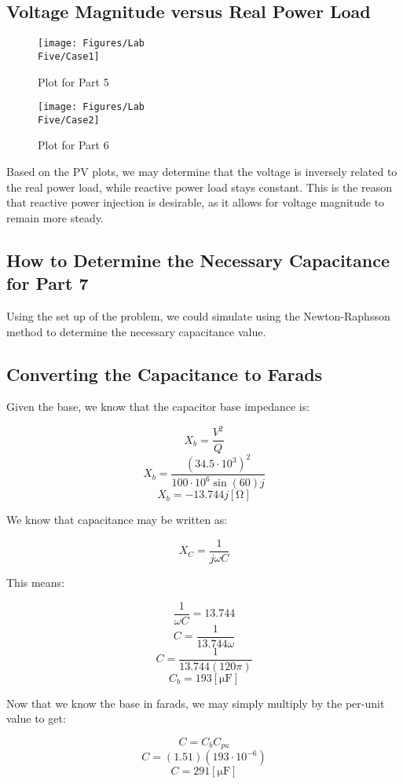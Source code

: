 \documentclass[
	letterpaper, %
	10pt, %
]{CSUniSchoolLabReport}
\begin{document}
\subsection{Voltage Magnitude versus Real Power Load}

\begin{figure}[H]
  \centering
  \texttt{[image: Figures/Lab\\ Five/Case1]}
  \caption{Plot for Part 5}
  \label{fig:10}
\end{figure}

\begin{figure}[H]
  \centering
  \texttt{[image: Figures/Lab\\ Five/Case2]}
  \caption{Plot for Part 6}
  \label{fig:11}
\end{figure}

Based on the PV plots, we may determine that the voltage is inversely related to the real power load, while reactive power load stays constant. This is the reason that reactive power injection is desirable, as it allows for voltage magnitude to remain more steady.

\subsection{How to Determine the Necessary Capacitance for Part 7}

Using the set up of the problem, we could simulate using the Newton-Raphsson method to determine the necessary capacitance value.

\subsection{Converting the Capacitance to Farads}

Given the base, we know that the capacitor base impedance is:

$$X_{b}=\frac{V^2}{Q}$$
$$X_{b}=\frac{(34.5\cdot10^3)^2}{100\cdot10^{6}\sin(60)j}$$
$$X_{b}=-13.744j[\si{\ohm}]$$

We know that capacitance may be written as:

$$X_C=\frac{1}{j\omega C}$$

This means:

$$\frac{1}{\omega C}=13.744$$
$$C=\frac{1}{13.744\omega}$$
$$C=\frac{1}{13.744(120\pi)}$$
$$C_b=193[\si{\micro\farad}]$$

Now that we know the base in farads, we may simply multiply by the per-unit value to get:

$$C=C_bC_{pu}$$
$$C=(1.51)(193\cdot10^{-6})$$
$$\boxed{C=291[\si{\micro\farad}]}$$
\end{document}
